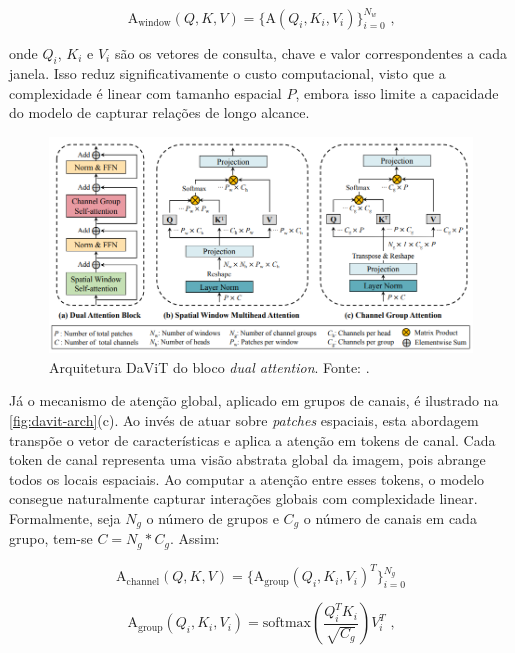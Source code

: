 \begin{equation}
    \text{A}_{\text{window}}(Q, K, V) = \lbrace \text{A}(Q_i,K_i,V_i) \rbrace ^{N_w}_{i=0} \text{ ,}
\end{equation}

onde $Q_i$, $K_i$ e $V_i$ são os vetores de consulta, chave e valor correspondentes a cada janela. Isso reduz significativamente o custo computacional, visto que a complexidade é linear com tamanho espacial $P$, embora isso limite a capacidade do modelo de capturar relações de longo alcance.

\begin{figure}[h]
    \centering
    \includegraphics[width=\linewidth]{figs/davit-arch.png}
    \caption{Arquitetura DaViT do bloco \textit{dual attention}. Fonte: \cite{ding2022davitdualattentionvision}.}
    \label{fig:davit-arch}
\end{figure}

Já o mecanismo de atenção global, aplicado em grupos de canais, é ilustrado na \autoref{fig:davit-arch}(c). Ao invés de atuar sobre \textit{patches} espaciais, esta abordagem transpõe o vetor de características e aplica a atenção em tokens de canal. Cada token de canal representa uma visão abstrata global da imagem, pois abrange todos os locais espaciais. Ao computar a atenção entre esses tokens, o modelo consegue naturalmente capturar interações globais com complexidade linear. Formalmente, seja $N_g$ o número de grupos e $C_g$ o número de canais em cada grupo, tem-se $C=N_g * C_g$. Assim:

\begin{equation}
    \text{A}_{\text{channel}}(Q, K, V) = \lbrace \text{A}_{\text{group}}(Q_i,K_i,V_i)^T \rbrace^{N_g}_{i=0}
\end{equation}

\begin{equation}
    \text{A}_{\text{group}}(Q_i, K_i, V_i) = \text{softmax}\left(\frac{Q_i^T K_i}{\sqrt{C_g}}\right) V_i^T \text{ ,}
\end{equation}

